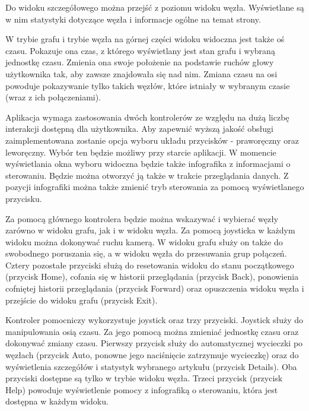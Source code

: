 Do widoku szczegółowego można przejść z poziomu widoku węzła. Wyświetlane są w nim statystyki dotyczące węzła i informacje ogólne na temat strony.

W trybie grafu i trybie węzła na górnej części widoku widoczna jest także oś czasu. Pokazuje ona czas, z którego wyświetlany jest stan grafu i wybraną jednostkę czasu. Zmienia ona swoje położenie na podstawie ruchów głowy użytkownika tak, aby zawsze znajdowała się nad nim. Zmiana czasu na osi powoduje pokazywanie tylko takich węzłów, które istniały w wybranym czasie (wraz z ich połączeniami).

Aplikacja wymaga zastosowania dwóch kontrolerów ze względu na dużą liczbę interakcji dostępną dla użytkownika. Aby zapewnić wyższą jakość obsługi zaimplementowana zostanie opcja wyboru układu przycisków - praworęczny oraz leworęczny. Wybór ten będzie możliwy przy starcie aplikacji. W momencie wyświetlania okna wyboru widoczna będzie także infografika z informacjami o sterowaniu. Będzie można  otworzyć ją także w trakcie przeglądania danych. Z pozycji infografiki można także zmienić tryb sterowania za pomocą wyświetlanego przycisku.

Za pomocą głównego kontrolera będzie można wskazywać i wybierać węzły zarówno w widoku grafu, jak i w widoku węzła. Za pomocą joysticka w każdym widoku można dokonywać ruchu kamerą. W widoku grafu służy on także do swobodnego poruszania się, a w widoku węzła do przesuwania grup połączeń. Cztery pozostałe przyciski służą do resetowania widoku do stanu początkowego (przycisk Home), cofania się w historii przeglądania (przycisk Back), ponowienia cofniętej historii przeglądania (przycisk Forward) oraz opuszczenia widoku węzła i przejście do widoku grafu (przycisk Exit).

Kontroler pomocniczy wykorzystuje joystick oraz trzy przyciski. Joystick służy do manipulowania osią czasu. Za jego pomocą można zmieniać jednostkę czasu oraz dokonywać zmiany czasu. Pierwszy przycisk służy do automatycznej wycieczki po węzłach (przycisk Auto, ponowne jego naciśnięcie zatrzymuje wycieczkę) oraz do wyświetlenia szczegółów i statystyk wybranego artykułu (przycisk Details). Oba przyciski dostępne są tylko w trybie widoku węzła. Trzeci przycisk (przycisk Help) powoduje wyświetlenie pomocy z infografiką o sterowaniu, która jest dostępna w każdym widoku.

